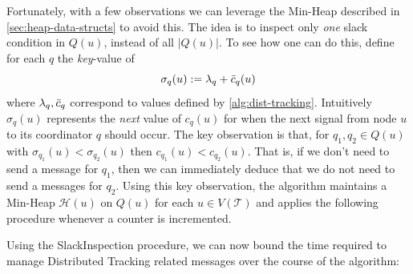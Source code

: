 Fortunately, with a few observations we can leverage the Min-Heap described in \cref{sec:heap-data-structs} to avoid this. The idea is to inspect only \textit{one} slack condition in $Q(u)$, instead of all $|Q(u)|$. To see how one can do this, define for each $q$ the \textit{key}-value of 
\begin{equation}
    \sigma_q(u) := \lambda_q + \Bar{c}_q(u)
\end{equation}
where $\lambda_q, \Bar{c}_q$ correspond to values defined by \cref{alg:dist-tracking}. Intuitively $\sigma_q(u)$ represents the \textit{next} value of $c_q(u)$ for when the next signal from node $u$ to its coordinator $q$ should occur. The key observation is that, for $q_1, q_2 \in Q(u)$ with $\sigma_{q_{1}}(u) < \sigma_{q_{2}}(u)$ then $c_{q_1}(u) < c_{q_2}(u)$. That is, if we don't need to send a message for $q_1$, then we can immediately deduce that we do not need to send a messages for $q_2$. Using this key observation, the algorithm maintains a Min-Heap $\mathcal{H}(u)$ on $Q(u)$ for each $u\in V(\mathcal{T})$ and applies the following procedure whenever a counter is incremented.

\begin{algorithm}\label{alg:slack-inspection}
\begin{algorithmic}[1]
\State {}
\State {}
\State {}
\Statex {}
\Statex {}
\EndProcedure
\end{algorithmic}
\end{algorithm}

Using the SlackInspection procedure, we can now bound the time required to manage Distributed Tracking related messages over the course of the algorithm:


